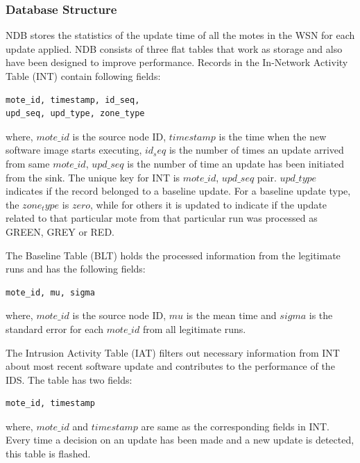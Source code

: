 \documentclass[conference,final]{IEEEtran}
\begin{document}
\subsubsection{Database Structure}
\label{ssc:db}
NDB stores the statistics of the update time of all the motes in the WSN for each update applied.
NDB consists of three flat tables that work as storage and also have been designed to improve performance. 
Records in the In-Network Activity Table (INT) contain following fields:
\begin{verbatim}
mote_id, timestamp, id_seq, 
upd_seq, upd_type, zone_type
\end{verbatim}
where, $mote\_id$ is the source node ID, $timestamp$ is the time when the new software image starts executing, $id_seq$ is the number of times an update arrived from same $mote\_id$, $upd\_seq$ is the number of time an update has been initiated from the sink.
The unique key for INT is $mote\_id$, $upd\_seq$ pair.
$upd\_type$ indicates if the record belonged to a baseline update.
For a baseline update type, the $zone_type$ is $zero$, while for others it is updated to indicate if the update related to that particular mote from that particular run was processed as GREEN, GREY or RED.

The Baseline Table (BLT) holds the processed information from the legitimate runs and has the following fields:
\begin{verbatim}
mote_id, mu, sigma
\end{verbatim}
where, $mote\_id$ is the source node ID, $mu$ is the mean time and $sigma$ is the standard error for each $mote\_id$ from all legitimate runs.

The Intrusion Activity Table (IAT) filters out necessary information from INT about most recent software update and contributes to the performance of the IDS.
The table has two fields:
\begin{verbatim}
mote_id, timestamp
\end{verbatim}
where, $mote\_id$  and $timestamp$ are same as the corresponding fields in INT.
Every time a decision on an update has been made and a new update is detected, this table is flashed.
\end{document}

